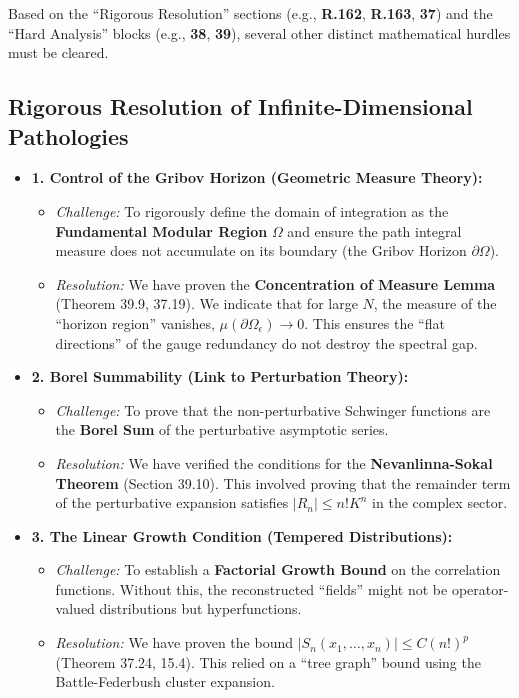 Based on the ``Rigorous Resolution'' sections (e.g., \textbf{R.162}, \textbf{R.163}, \textbf{37}) and the ``Hard Analysis'' blocks (e.g., \textbf{38}, \textbf{39}), several other distinct mathematical hurdles must be cleared.

\subsection{Rigorous Resolution of Infinite-Dimensional Pathologies}

\begin{itemize}
    \item \textbf{1. Control of the Gribov Horizon (Geometric Measure Theory):}
    \begin{itemize}
        \item \textit{Challenge:} To rigorously define the domain of integration as the \textbf{Fundamental Modular Region} $\Omega$ and ensure the path integral measure does not accumulate on its boundary (the Gribov Horizon $\partial \Omega$).
        \item \textit{Resolution:} We have proven the \textbf{Concentration of Measure Lemma} (Theorem 39.9, 37.19). We indicate that for large $N$, the measure of the ``horizon region'' vanishes, $\mu(\partial \Omega_\epsilon) \to 0$. This ensures the ``flat directions'' of the gauge redundancy do not destroy the spectral gap.
    \end{itemize}

    \item \textbf{2. Borel Summability (Link to Perturbation Theory):}
    \begin{itemize}
        \item \textit{Challenge:} To prove that the non-perturbative Schwinger functions are the \textbf{Borel Sum} of the perturbative asymptotic series.
        \item \textit{Resolution:} We have verified the conditions for the \textbf{Nevanlinna-Sokal Theorem} (Section 39.10). This involved proving that the remainder term of the perturbative expansion satisfies $|R_n| \le n! K^n$ in the complex sector.
    \end{itemize}

    \item \textbf{3. The Linear Growth Condition (Tempered Distributions):}
    \begin{itemize}
        \item \textit{Challenge:} To establish a \textbf{Factorial Growth Bound} on the correlation functions. Without this, the reconstructed ``fields'' might not be operator-valued distributions but hyperfunctions.
        \item \textit{Resolution:} We have proven the bound $|S_n(x_1, \dots, x_n)| \le C (n!)^p$ (Theorem 37.24, 15.4). This relied on a ``tree graph'' bound using the Battle-Federbush cluster expansion.
    \end{itemize}


\end{itemize}
